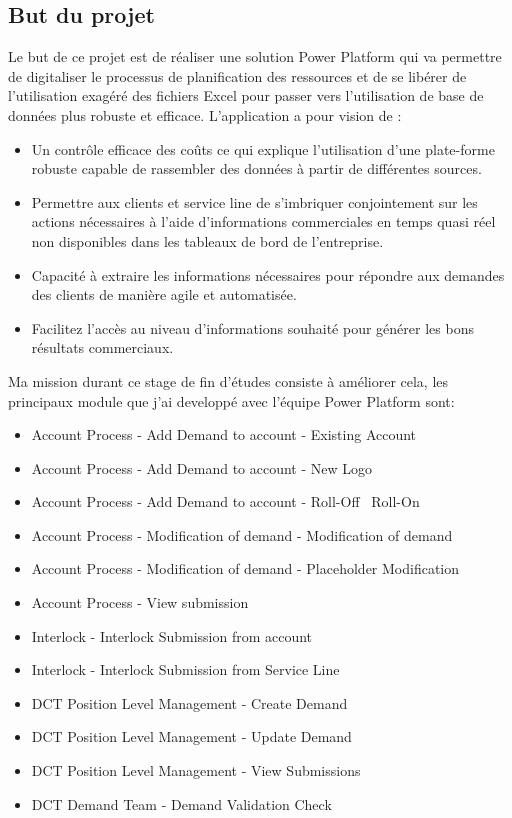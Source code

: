 \subsection{But du projet}

Le but de ce projet est de réaliser une solution Power Platform qui va permettre de digitaliser le processus de planification des ressources et de se libérer de l’utilisation exagéré des fichiers Excel pour passer vers l’utilisation de base de données plus robuste et efficace. L’application a pour vision de :  
\\

\begin{itemize}
  \item Un contrôle efficace des coûts ce qui explique l'utilisation d'une plate-forme robuste capable de rassembler des données à partir de différentes sources.
  \item Permettre aux clients et service line de s'imbriquer conjointement sur les actions nécessaires à l'aide d'informations commerciales en temps quasi réel non disponibles dans les tableaux de bord de l'entreprise.
  \item Capacité à extraire les informations nécessaires pour répondre aux demandes des clients de manière agile et automatisée.
  \item Facilitez l'accès au niveau d'informations souhaité pour générer les bons résultats commerciaux.
\end{itemize}

Ma mission durant ce stage de fin d’études consiste à améliorer cela, les principaux module que j'ai developpé avec l'équipe Power Platform sont:
\\
\begin{itemize}
  \item Account Process - Add Demand to account - Existing Account
  \item Account Process - Add Demand to account - New Logo
  \item Account Process - Add Demand to account - Roll-Off \ Roll-On
  \item Account Process - Modification of demand - Modification of demand
  \item Account Process - Modification of demand - Placeholder Modification
  \item Account Process - View submission
  \item Interlock - Interlock Submission from account 
  \item Interlock - Interlock Submission from Service Line
  \item DCT Position Level Management - Create Demand
  \item DCT Position Level Management - Update Demand
  \item DCT Position Level Management - View Submissions
  \item DCT Demand Team - Demand Validation Check
\end{itemize}

